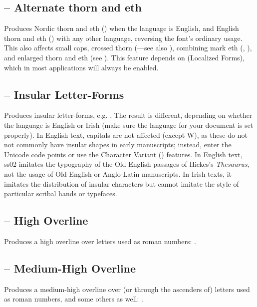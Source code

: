 \subsection{ – Alternate thorn and eth}
Produces Nordic thorn and eth ()
when the language is English, and English thorn and eth
() with any other language,
reversing the font’s ordinary usage.
This also affects small caps, crossed
thorn (—see also
\hyperlink{OtherLatin}{}), combining mark eth
(, ), and enlarged thorn and eth
(see ).
This feature depends on  (Localized Forms), which in most applications will
always be enabled.

\subsection{ – Insular Letter-Forms}
Produces insular letter-forms, e.g. .
The result is different,
depending on whether the language is English or Irish (make sure the language for your document is set
properly). In English text, capitals are not affected (except W), as these do not not commonly have
insular shapes in early manuscripts; instead, enter the Unicode code points or use the Character Variant
() features. In English text, ss02 imitates the typography of the Old English
passages of Hickes’s \textit{Thesaurus}, not the usage of Old English or Anglo-Latin manuscripts. In
Irish texts, it imitates the distribution of insular characters but cannot imitate the style of
particular scribal hands or typefaces.

\subsection{ – High
Overline}
Produces a high overline over letters used as roman numbers: .

\subsection{ –
Medium-High Overline}
Produces a medium-high overline over (or through the ascenders of) letters used as roman numbers, and some others as
well: .

